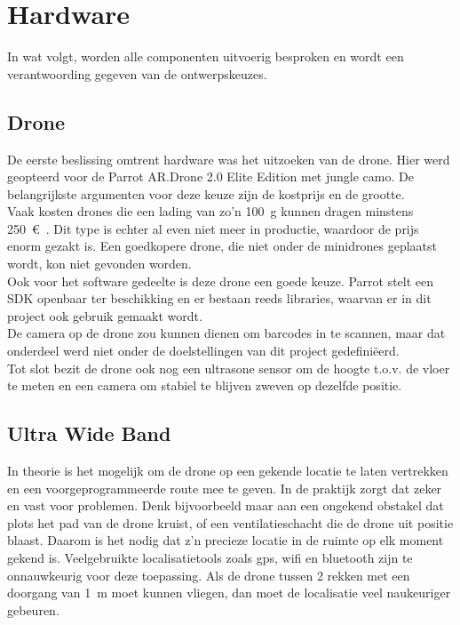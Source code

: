 \chapter{Hardware}
In wat volgt, worden alle componenten uitvoerig besproken en wordt een verantwoording gegeven van de ontwerpskeuzes.

\section{Drone} \label{sec:drone}
De eerste beslissing omtrent hardware was het uitzoeken van de drone. Hier werd geopteerd voor de Parrot AR.Drone 2.0 Elite Edition met jungle camo. De belangrijkste argumenten voor deze keuze zijn de kostprijs en de grootte.\\

Vaak kosten drones die een lading van zo'n \SI{100}{\g} kunnen dragen minstens \SI{250}{\euro{}}. Dit type is echter al even niet meer in productie, waardoor de prijs enorm gezakt is. Een goedkopere drone, die niet onder de minidrones geplaatst wordt, kon niet gevonden worden.\\

Ook voor het software gedeelte is deze drone een goede keuze. Parrot stelt een SDK openbaar ter beschikking en er bestaan reeds libraries, waarvan er in dit project ook gebruik gemaakt wordt.\\
De camera op de drone zou kunnen dienen om barcodes in te scannen, maar dat onderdeel werd niet onder de doelstellingen van dit project gedefini\"eerd.\\
Tot slot bezit de drone ook nog een ultrasone sensor om de hoogte t.o.v. de vloer te meten en een camera om stabiel te blijven zweven op dezelfde positie.

\section{Ultra Wide Band}  \label{sec:uwb}
In theorie is het mogelijk om de drone op een gekende locatie te laten vertrekken en een voorgeprogrammeerde route mee te geven. In de praktijk zorgt dat zeker en vast voor problemen. Denk bijvoorbeeld maar aan een ongekend obstakel dat plots het pad van de drone kruist, of een ventilatieschacht die de drone uit positie blaast. Daarom is het nodig dat z'n precieze locatie in de ruimte op elk moment gekend is. Veelgebruikte localisatietools zoals gps, wifi en bluetooth zijn te onnauwkeurig voor deze toepassing. Als de drone tussen 2 rekken met een doorgang van \SI{1}{\m} moet kunnen vliegen, dan moet de localisatie veel naukeuriger gebeuren.\\


